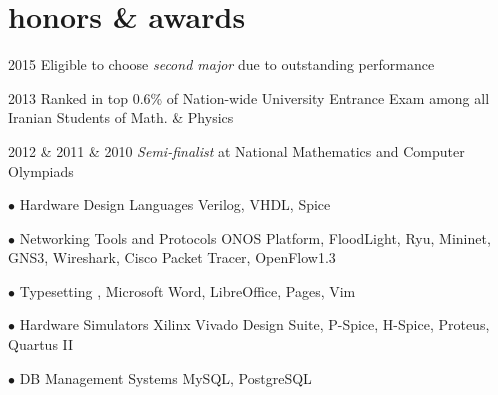 \documentclass[]{friggeri-cv} %
\begin{document}

\section{honors \& awards}

\begin{entrylist}


\entry
{2015}
{}
{}
{Eligible to choose \emph{second major} due to outstanding performance}


\entry
{2013}
{}
{}
{Ranked in top 0.6\% of Nation-wide University Entrance Exam among all Iranian Students of Math. \& Physics}


\entry
{2012 & 2011 & 2010}
{}
{}
{\emph{Semi-finalist} at National Mathematics and Computer Olympiads}

\end{entrylist}


\entry
{$\bullet$}
{Hardware Design Languages}
{}
{Verilog, VHDL, Spice}


\entry
{$\bullet$}
{Networking Tools and Protocols}
{}
{ONOS Platform, FloodLight, Ryu, Mininet, GNS3, Wireshark, Cisco Packet Tracer, OpenFlow1.3}


\entry
{$\bullet$}
{Typesetting}
{}
{\latex, Microsoft Word, LibreOffice, Pages, Vim}


\entry
{$\bullet$}
{Hardware Simulators}
{}
{Xilinx Vivado Design Suite, P-Spice, H-Spice, Proteus, Quartus II}


\entry
{$\bullet$}
{DB Management Systems}
{}
{MySQL, PostgreSQL}
\end{document}
